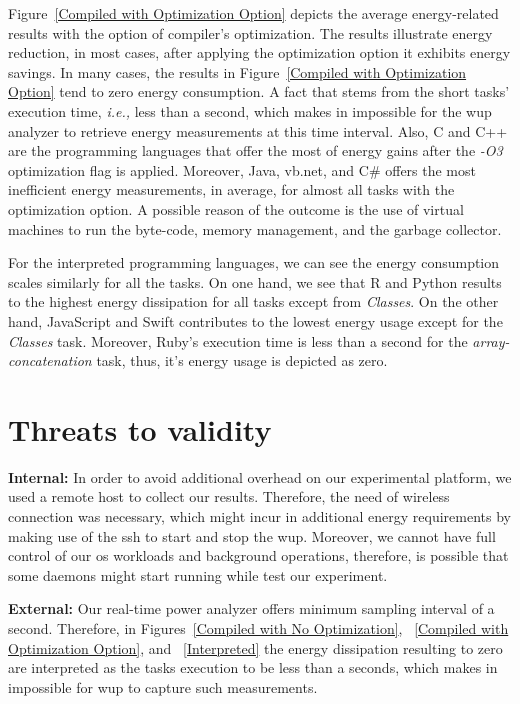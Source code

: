 Figure~\ref{Compiled with Optimization Option} depicts the average 
energy-related results with the option of compiler's optimization. 
The results illustrate energy reduction, in most cases, after 
applying the optimization option it exhibits energy savings. 
In many cases, the results in Figure~\ref{Compiled with Optimization Option} 
tend to zero energy consumption.
A fact that stems from the short tasks' execution time, \textit{i.e.,} 
less than a second, which makes in impossible for the {\sc wup} analyzer 
to retrieve energy measurements at this time interval.
Also, C and C++ are the programming languages that offer the most 
of energy gains after the \textit{-O3} optimization flag 
is applied. 
Moreover, Java, {\sc vb.net}, and C\# offers the most inefficient 
energy measurements, in average, for almost all tasks with the 
optimization option. 
A possible reason of the outcome is the use of virtual machines to 
run the byte-code, memory management, and the garbage collector.

For the interpreted programming languages, we can see the energy 
consumption scales similarly for all the tasks. 
On one hand, we see that R and Python results to the highest energy 
dissipation for all tasks except from \textit{Classes}. 
On the other hand, JavaScript and Swift contributes to the lowest 
energy usage except for the \textit{Classes} task. 
Moreover, Ruby's execution time is less than a second for the 
\textit{array-concatenation} task, thus, it's energy usage is 
depicted as zero.


\section{Threats to validity} \label{threats_of_validity}
\noindent\textbf{Internal:} In order to avoid additional overhead 
on our experimental platform, we used a remote host to collect our 
results. 
Therefore, the need of wireless connection was necessary, which 
might incur in additional energy requirements by making use of 
the {\sc ssh} to start and stop the {\sc wup}. 
Moreover, we cannot have full control of our {\sc os} workloads 
and background operations, therefore, is possible that some 
daemons might start running while test our experiment.
  
\noindent\textbf{External:} Our real-time power analyzer offers minimum sampling 
interval of a second. 
Therefore, in Figures~\ref{Compiled with No Optimization}, 
~\ref{Compiled with Optimization Option}, and ~\ref{Interpreted} 
the energy dissipation resulting to zero are interpreted 
as the tasks execution to be less than a seconds, which makes in 
impossible for {\sc wup} to capture such measurements.

